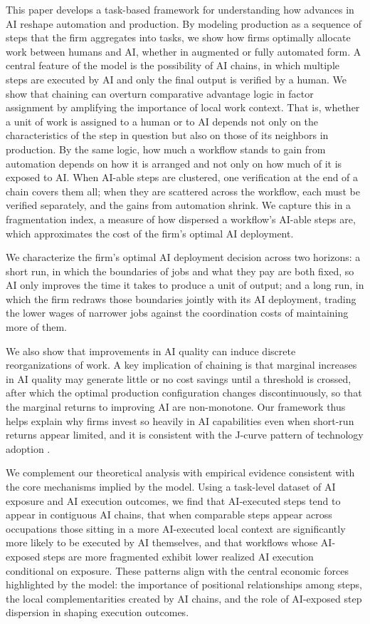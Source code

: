 This paper develops a task-based framework for understanding how advances in AI reshape automation and production.
By modeling production as a sequence of steps that the firm aggregates into tasks, we show how firms optimally allocate work between humans and AI, whether in augmented or fully automated form.
A central feature of the model is the possibility of AI chains, in which multiple steps are executed by AI and only the final output is verified by a human.
We show that chaining can overturn comparative advantage logic in factor assignment by amplifying the importance of local work context.
That is, whether a unit of work is assigned to a human or to AI depends not only on the characteristics of the step in question but also on those of its neighbors in production.
By the same logic, how much a workflow stands to gain from automation depends on how it is arranged and not only on how much of it is exposed to AI. 
When AI-able steps are clustered, one verification at the end of a chain covers them all; when they are scattered across the workflow, each must be verified separately, and the gains from automation shrink.
We capture this in a fragmentation index, a measure of how dispersed a workflow's AI-able steps are, which approximates the cost of the firm's optimal AI deployment.

We characterize the firm's optimal AI deployment decision across two horizons: a short run, in which the boundaries of jobs and what they pay are both fixed, so AI only improves the time it takes to produce a unit of output; and a long run, in which the firm redraws those boundaries jointly with its AI deployment, trading the lower wages of narrower jobs against the coordination costs of maintaining more of them.

We also show that improvements in AI quality can induce discrete reorganizations of work.
A key implication of chaining is that marginal increases in AI quality may generate little or no cost savings until a threshold is crossed, after which the optimal production configuration changes discontinuously, so that the marginal returns to improving AI are non-monotone.
Our framework thus helps explain why firms invest so heavily in AI capabilities even when short-run returns appear limited, and it is consistent with the J-curve pattern of technology adoption \citep{brynjolfsson2021productivity}.

We complement our theoretical analysis with empirical evidence consistent with the core mechanisms implied by the model.
Using a task-level dataset of AI exposure and AI execution outcomes, we find that AI-executed steps tend to appear in contiguous AI chains, that when comparable steps appear across occupations those sitting in a more AI-executed local context are significantly more likely to be executed by AI themselves, and that workflows whose AI-exposed steps are more fragmented exhibit lower realized AI execution conditional on exposure.
These patterns align with the central economic forces highlighted by the model: the importance of positional relationships among steps, the local complementarities created by AI chains, and the role of AI-exposed step dispersion in shaping execution outcomes.
